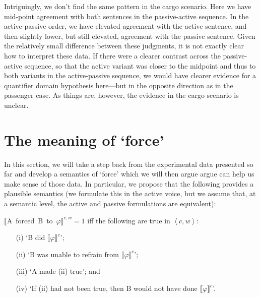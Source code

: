 \documentclass{salt}
\newcommand{\sem}[2]{\mbox{$\llbracket${#2}$\rrbracket^{#1}$}}
\newcommand{\seq}[1]{\left\langle {#1} \right\rangle}
\begin{document}
Intriguingly, we don't find the same pattern in the cargo scenario. Here we have mid-point agreement with both sentences in the passive-active sequence. In the active-passive order, we have elevated agreement with the active sentence, and then slightly lower, but still elevated, agreement with the passive sentence. Given the relatively small difference between these judgments, it is not exactly clear how to interpret these data. If there were a clearer contrast across the passive-active sequence, so that the active variant was closer to the midpoint and thus to both variants in the active-passive sequence, we would have clearer evidence for a quantifier domain hypothesis here---but in the opposite direction as in the passenger case. As things are, however, the evidence in the cargo scenario is unclear.


\section{The meaning of `force'}\label{sec:account}


In this section, we will take a step back from the experimental data presented so far and develop a semantics of `force' which we will then argue argue can help us make sense of those data. In particular, we propose that the following provides a plausible semantics (we formulate this in the active voice, but we assume that, at a semantic level, the active and passive formulations are equivalent):

\begin{exe}\ex \label{102}\sem{c,w}{A forced B to $\varphi$}$=1$ iff the following are true in $\seq{c,w}$: 

\begin{itemize} 
\item[(i)] `B did \sem{c}{$\varphi$}'; \item[(ii)] `B was unable to refrain from \sem{c}{$\varphi$}'; \item[(iii)] `A made (ii) true'; and \item[(iv)] `If (ii) had not been true, then B would not have done \sem{c}{$\varphi$}'.
\end{itemize}
\end{exe}
\end{document}
